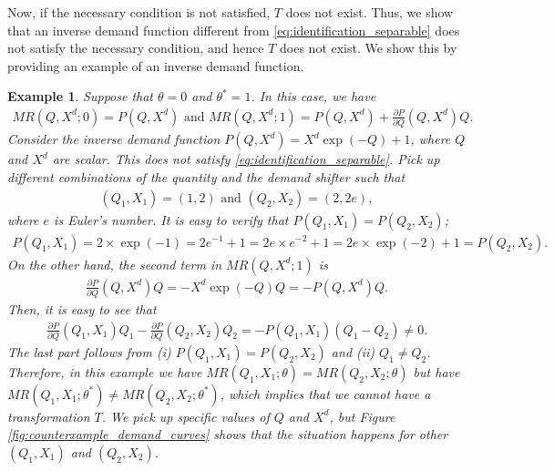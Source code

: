 \documentclass[11pt, a4paper]{article}
\newtheorem{example}{Example}
\theoremstyle{remark}
\begin{document}
Now, if the necessary condition is not satisfied, $T$ does not exist.
Thus, we show that an inverse demand function different from \eqref{eq:identification_separable} does not satisfy the necessary condition, and hence $T$ does not exist.
We show this by providing an example of an inverse demand function.


\begin{example}\label{counter_example_demand_curves}
    Suppose that $\theta = 0$ and $\theta^{*} = 1$.
    In this case, we have
    \begin{align}
        MR(Q, X^{d};0) = P(Q,X^{d})\text{ and } MR(Q, X^{d};1) = P(Q, X^d) + \frac{\partial P}{\partial Q}(Q, X^d) Q.
    \end{align}
    Consider the inverse demand function $P(Q,X^{d}) = X^{d}\exp(-Q) + 1$, where $Q$ and $X^{d}$ are scalar.
    This does not satisfy \eqref{eq:identification_separable}.
    Pick up different combinations of the quantity and the demand shifter such that 
    \begin{align}
        (Q_1, X_1) = (1, 2) \text{ and } (Q_2, X_2) = (2, 2e),
    \end{align}
    where $e$ is Euler's number.
    It is easy to verify that $P(Q_1, X_1) = P(Q_2, X_2)$;
    \begin{align}
        P(Q_1, X_1) = 2 \times \exp(-1) = 2 e^{-1} + 1 = 2 e \times e^{-2} +1 = 2e \times \exp(-2)  +1=  P(Q_2, X_2).
    \end{align}
    On the other hand, the second term in $MR(Q, X^{d};1)$ is
    \begin{align}
        \frac{\partial P}{\partial Q}(Q, X^{d})Q = - X^{d} \exp(-Q) Q = - P(Q,X^{d})Q.
    \end{align}
    Then, it is easy to see that 
    \begin{align}
        \frac{\partial P}{\partial Q}(Q_1, X_1)Q_1 - \frac{\partial P}{\partial Q}(Q_2, X_2)Q_2 = - P(Q_1,X_1)(Q_1 - Q_2) \ne 0.
    \end{align}
    The last part follows from (i) $P(Q_1, X_1) = P(Q_2, X_2)$ and (ii) $Q_1 \ne Q_2$.
    Therefore, in this example we have $MR(Q_1, X_1; \theta) = MR(Q_2, X_2; \theta)$ but have $MR(Q_1, X_1; \theta^{*}) \ne MR(Q_2, X_2; \theta^{*})$, which implies that we cannot have a transformation $T$.
    We pick up specific values of $Q$ and $X^{d}$, but Figure \ref{fig:counterxample_demand_curves} shows that the situation happens for other $(Q_1, X_1)$ and $(Q_2, X_2)$.


\end{example}
\end{document}
